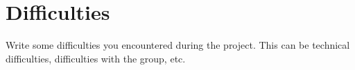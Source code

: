 \section{Difficulties}

Write some difficulties you encountered during the project. This can be technical difficulties, difficulties with the group, etc.
